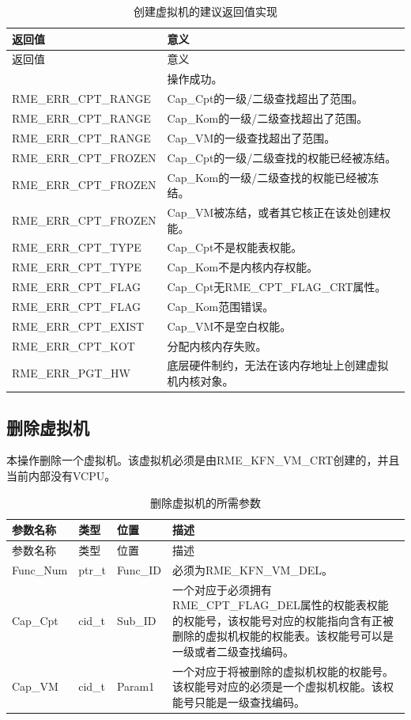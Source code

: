 \begin{xltabular}{\textwidth}{@{}>{\hsize\raggedright\arraybackslash}X>{\hsize\raggedright\arraybackslash}X@{}}
\caption{创建虚拟机的建议返回值实现}\label{tab:8-74-create-virtual-machine-suggested-return-values}\\
\toprule
返回值 & 意义\tabularnewline
\endfirsthead
\toprule
返回值 & 意义\tabularnewline
\midrule
\endhead
\bottomrule
{} & 操作成功。\tabularnewline
    RME\_ERR\_CPT\_RANGE & Cap\_Cpt的一级/二级查找超出了范围。\tabularnewline
    RME\_ERR\_CPT\_RANGE & Cap\_Kom的一级/二级查找超出了范围。\tabularnewline
    RME\_ERR\_CPT\_RANGE & Cap\_VM的一级查找超出了范围。\tabularnewline
    RME\_ERR\_CPT\_FROZEN & Cap\_Cpt的一级/二级查找的权能已经被冻结。\tabularnewline
    RME\_ERR\_CPT\_FROZEN & Cap\_Kom的一级/二级查找的权能已经被冻结。\tabularnewline
    RME\_ERR\_CPT\_FROZEN & Cap\_VM被冻结，或者其它核正在该处创建权能。\tabularnewline
    RME\_ERR\_CPT\_TYPE & Cap\_Cpt不是权能表权能。\tabularnewline
    RME\_ERR\_CPT\_TYPE & Cap\_Kom不是内核内存权能。\tabularnewline
    RME\_ERR\_CPT\_FLAG & Cap\_Cpt无RME\_CPT\_FLAG\_CRT属性。\tabularnewline
    RME\_ERR\_CPT\_FLAG & Cap\_Kom范围错误。\tabularnewline
    RME\_ERR\_CPT\_EXIST & Cap\_VM不是空白权能。\tabularnewline
    RME\_ERR\_CPT\_KOT & 分配内核内存失败。\tabularnewline
    RME\_ERR\_PGT\_HW & 底层硬件制约，无法在该内存地址上创建虚拟机内核对象。\tabularnewline
\end{xltabular}

\subsection{删除虚拟机}\label{subsec:8-delete-virtual-machine}

本操作删除一个虚拟机。该虚拟机必须是由RME\_KFN\_VM\_CRT创建的，并且当前内部没有VCPU。

\begin{xltabular}{\textwidth}{@{}>{\hsize\raggedright\arraybackslash}X>{\hsize\raggedright\arraybackslash}X>{\hsize\raggedright\arraybackslash}X>{\hsize\raggedright\arraybackslash}X@{}}
\caption{删除虚拟机的所需参数}\label{tab:8-75-delete-virtual-machine-parameters}\\
\toprule
参数名称 & 类型 & 位置 & 描述\tabularnewline
\endfirsthead
\toprule
参数名称 & 类型 & 位置 & 描述\tabularnewline
\midrule
\endhead
\bottomrule
\endlastfoot
Func\_Num & ptr\_t & Func\_ID & 必须为RME\_KFN\_VM\_DEL。\tabularnewline
Cap\_Cpt & cid\_t & Sub\_ID &
一个对应于必须拥有RME\_CPT\_FLAG\_DEL属性的权能表权能的权能号，该权能号对应的权能指向含有正被删除的虚拟机权能的权能表。该权能号可以是一级或者二级查找编码。\tabularnewline
Cap\_VM & cid\_t & Param1 &
一个对应于将被删除的虚拟机权能的权能号。该权能号对应的必须是一个虚拟机权能。该权能号只能是一级查找编码。\tabularnewline
\end{xltabular}

